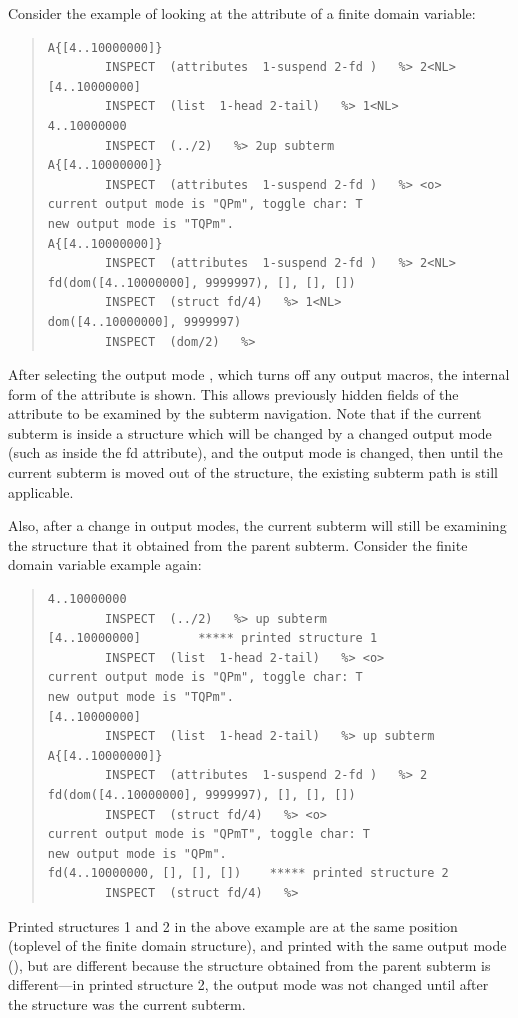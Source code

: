 \begin{descr}{1cm}
Consider the example of looking at the attribute of a finite domain variable:
\begin{quote}
\begin{verbatim}
A{[4..10000000]}
        INSPECT  (attributes  1-suspend 2-fd )   %> 2<NL>
[4..10000000]
        INSPECT  (list  1-head 2-tail)   %> 1<NL>
4..10000000
        INSPECT  (../2)   %> 2up subterm
A{[4..10000000]}
        INSPECT  (attributes  1-suspend 2-fd )   %> <o>
current output mode is "QPm", toggle char: T
new output mode is "TQPm".
A{[4..10000000]}
        INSPECT  (attributes  1-suspend 2-fd )   %> 2<NL>
fd(dom([4..10000000], 9999997), [], [], [])
        INSPECT  (struct fd/4)   %> 1<NL>
dom([4..10000000], 9999997)
        INSPECT  (dom/2)   %>
\end{verbatim}
\end{quote}

After selecting the output mode , which turns off any output
macros, the internal form of the attribute is shown. This allows previously
hidden fields of the attribute to be examined by the subterm navigation.
Note that if the current subterm is inside a structure which will be
changed by a changed output mode (such as inside the fd attribute), and the
output mode is changed, then until the current subterm is moved out of the
structure, the existing subterm path is still applicable.

Also, after a change in output modes, the current subterm will still be
examining the structure that it obtained from the parent subterm. Consider
the finite domain variable example again:

\begin{quote}
\begin{verbatim}
4..10000000
        INSPECT  (../2)   %> up subterm
[4..10000000]        ***** printed structure 1
        INSPECT  (list  1-head 2-tail)   %> <o>
current output mode is "QPm", toggle char: T
new output mode is "TQPm".
[4..10000000]
        INSPECT  (list  1-head 2-tail)   %> up subterm
A{[4..10000000]}
        INSPECT  (attributes  1-suspend 2-fd )   %> 2
fd(dom([4..10000000], 9999997), [], [], [])
        INSPECT  (struct fd/4)   %> <o>
current output mode is "QPmT", toggle char: T
new output mode is "QPm".
fd(4..10000000, [], [], [])    ***** printed structure 2
        INSPECT  (struct fd/4)   %>

\end{verbatim}
\end{quote}

Printed structures 1 and 2 in the above example are at the same position
(toplevel of the finite domain structure), and printed with the same output
mode (), but are different because the structure obtained from
the parent subterm is different---in printed structure 2, the output mode
was not changed until after the  structure was the current
subterm.

\end{descr}


